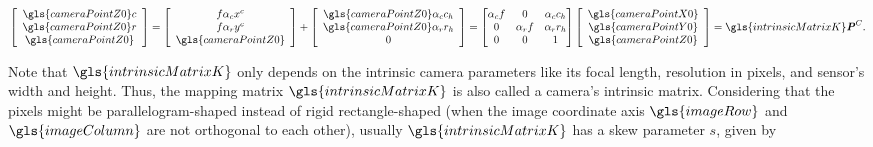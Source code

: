 \begin{equation}
\left[ \begin{array}{c} \gls{cameraPointZ0} c \\ \gls{cameraPointZ0} r \\ \gls{cameraPointZ0}  \end{array} \right] %
= %
\left[ \begin{array}{c} f\alpha_c x^c \\ f \alpha_r y^c \\ \gls{cameraPointZ0} \end{array} \right]%
+
\left[ \begin{array}{c}  \gls{cameraPointZ0} \alpha_c c_h \\ \gls{cameraPointZ0} \alpha_r r_h \\ 0 \end{array} \right] %
=  \begin{bmatrix} \alpha_c f & 0 &  \alpha_c c_h  \\ 0 & \alpha_r f & \alpha_r r_h \\ 0 & 0 & 1 \end{bmatrix}%
\left[ \begin{array}{c} \gls{cameraPointX0} \\ \gls{cameraPointY0} \\ \gls{cameraPointZ0} \end{array} \right]%
= \gls{intrinsicMatrixK} \textbf{\textit{P}}^C  .
\label{HomoProportionalFromCamToImInPixels}
\end{equation}%

\noindent
Note that \(\gls{intrinsicMatrixK}\) only depends on the intrinsic camera parameters like its focal length, resolution in pixels, and sensor's width and height. Thus, the mapping matrix \(\gls{intrinsicMatrixK}\) is also called a camera's intrinsic matrix. Considering that the pixels might be parallelogram-shaped instead of rigid rectangle-shaped (when the image coordinate axis \(\gls{imageRow}\) and \(\gls{imageColumn}\) are not orthogonal to each other), usually \(\gls{intrinsicMatrixK}\) has a skew parameter \(s\), given by

